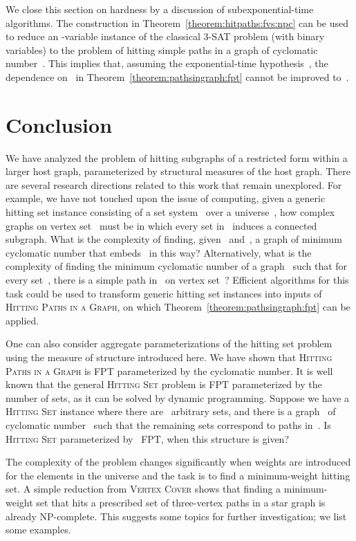 \let\accentvec\vec  \documentclass{llncs}
\newcommand{\HitPathsInGraph}{\textsc{Hitting Paths in a Graph}\xspace}
\newcommand{\VertexCover}{\textsc{Vertex Cover}\xspace}
\newcommand{\HittingSet}{\textsc{Hitting Set}\xspace}
\begin{document}
We close this section on hardness by a discussion of subexponential-time algorithms. The construction in Theorem~\ref{theorem:hitpaths:fvs:npc} can be used to reduce an -variable instance of the classical 3-SAT problem (with binary variables) to the problem of hitting simple paths in a graph of cyclomatic number~. This implies that, assuming the exponential-time hypothesis~\cite{ImpagliazzoPZ01}, the dependence on~ in Theorem~\ref{theorem:pathsingraph:fpt} cannot be improved to~.

\section{Conclusion}

We have analyzed the problem of hitting subgraphs of a restricted form within a larger host graph, parameterized by structural measures of the host graph. There are several research directions related to this work that remain unexplored. For example, we have not touched upon the issue of computing, given a generic hitting set instance consisting of a set system~ over a universe~, how complex graphs on vertex set~ must be in which every set in~ induces a connected subgraph. What is the complexity of finding, given~ and~, a graph of minimum cyclomatic number that embeds~ in this way? Alternatively, what is the complexity of finding the minimum cyclomatic number of a graph~ such that for every set~, there is a simple path in~ on vertex set~? Efficient algorithms for this task 
could be used to transform generic hitting set instances into inputs of \HitPathsInGraph, on which Theorem~\ref{theorem:pathsingraph:fpt} can be applied.

One can also consider aggregate parameterizations of the hitting set problem using the measure of structure introduced here. We have shown that \HitPathsInGraph is FPT parameterized by the cyclomatic number. It is well known that the general \HittingSet problem is FPT parameterized by the number of sets, as it can be solved by dynamic programming. Suppose we have a \HittingSet instance where there are~ arbitrary sets, and there is a graph~ of cyclomatic number~ such that the remaining sets correspond to paths in~. Is \HittingSet parameterized by~ FPT, when this structure is given?

The complexity of the problem changes significantly when weights are introduced for the elements in the universe and the task is to find a minimum-weight hitting set. A simple reduction from \VertexCover shows that finding a minimum-weight set that hits a prescribed set of three-vertex paths in a star graph is already NP-complete. This suggests some topics for further investigation; we list some examples.
\end{document}
